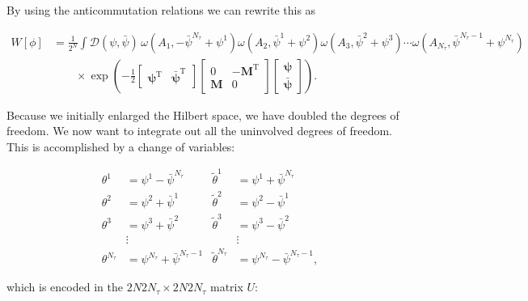 \documentclass{article}
\begin{document}
	By using the anticommutation relations we can rewrite this as
	

\begin{align}
	W\left[ \phi \right] &= \frac{1}{2^N}
	\int \mathcal{D}\left({\psi},\bar{\psi}\right)\,
	\omega\!\left(A_1, -\bar{\psi}^{N_\tau} + \psi^1\right)
	\omega\!\left(A_2, \bar{\psi}^1 + \psi^2\right)
	\omega\!\left(A_3, \bar{\psi}^2 + \psi^3\right)
	\cdots
	\omega\!\left(A_{N_\tau}, \bar{\psi}^{N_\tau - 1} + \psi^{N_\tau}\right) \nonumber \\
	&\quad \quad\times\exp\left(
	-\frac{1}{2}
	\begin{bmatrix}
		\boldsymbol{\psi}^{\mathrm T} & \boldsymbol{\bar{\psi}}^{\mathrm T}
	\end{bmatrix}
	\begin{bmatrix}
		0 & -\boldsymbol{M}^\mathrm{T}   \\ \boldsymbol{M} & 0
	\end{bmatrix}
	\begin{bmatrix}
		\boldsymbol{\psi} \\ \boldsymbol{\bar{\psi}}
	\end{bmatrix}
	\right).
\end{align}


Because we initially enlarged the Hilbert space, we have doubled the degrees of freedom. We now want to integrate out all the uninvolved degrees of freedom. This is accomplished by a change of variables:

\begin{align}
	\theta^1 &= \psi^1 - \bar{\psi}^{N_\tau}
	& \tilde{\theta}^1 &= \psi^1 + \bar{\psi}^{N_\tau} \nonumber \\
	\theta^2 &= \psi^2 + \bar{\psi}^1
	& \tilde{\theta}^2 &= \psi^2 - \bar{\psi}^1 \nonumber \\
	\theta^3 &= \psi^3 + \bar{\psi}^2
	& \tilde{\theta}^3 &= \psi^3 - \bar{\psi}^2 \nonumber \\
	& \vdots &
	& \vdots \nonumber \\
	\theta^{N_\tau} &= \psi^{N_\tau} + \bar{\psi}^{N_\tau - 1}
	& \tilde{\theta}^{N_\tau} &= \psi^{N_\tau} - \bar{\psi}^{N_\tau - 1},
\end{align}



which is encoded in the $2N 2N_\tau \times 2N 2N_\tau$ matrix $U$:
\end{document}
